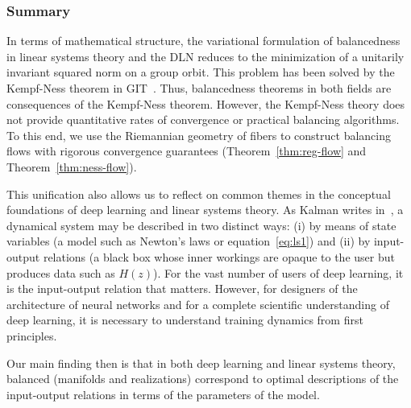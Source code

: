 
\subsubsection{Summary}
In terms of mathematical structure, the variational formulation of balancedness in linear systems theory and the DLN reduces to the minimization of a unitarily invariant squared norm on a group orbit. This problem has been solved by the Kempf-Ness theorem in GIT~\cite{Kempf}. Thus, balancedness theorems in both fields are consequences of the Kempf-Ness theorem. However, the Kempf-Ness theory does not provide quantitative rates of convergence or practical balancing algorithms. To this end, we use the Riemannian geometry of fibers to construct balancing flows with rigorous convergence guarantees (Theorem~\ref{thm:reg-flow} and Theorem~\ref{thm:ness-flow}). 



This unification also allows us to reflect on common themes in the conceptual foundations of deep learning and linear systems theory. As Kalman writes in~\cite{Kalman-can}, a dynamical system may be described in two distinct ways: (i) by means of state variables (a model such as Newton's laws or equation~\eqref{eq:ls1}) and (ii) by input-output relations (a black box whose inner workings are opaque to the user but produces data such as $H(z)$). For the vast number of users of deep learning, it is the input-output relation that matters. However, for designers of the architecture of neural networks and for a complete scientific understanding of deep learning, it is necessary to understand training dynamics from first principles.





Our main finding then is that in both deep learning and linear systems theory, balanced (manifolds and realizations) correspond to optimal descriptions of the input-output relations in terms of the parameters of the model. 


